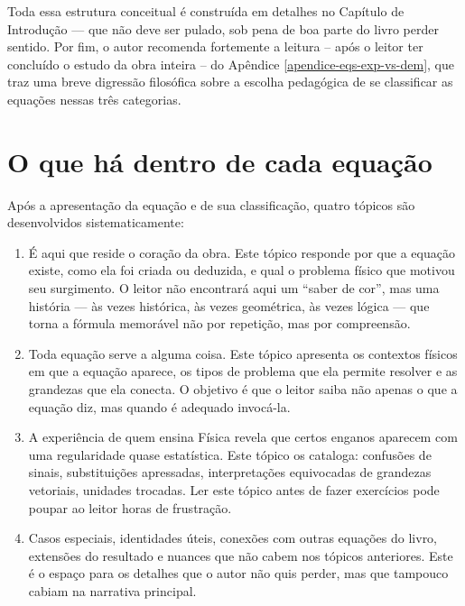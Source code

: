 Toda essa estrutura conceitual é construída em detalhes no Capítulo de Introdução ---
que não deve ser pulado, sob pena de boa parte do livro perder sentido. Por fim, o autor recomenda fortemente a leitura -- após o leitor ter concluído o estudo da obra inteira -- do Apêndice \ref{apendice-eqs-exp-vs-dem}, que traz uma breve digressão filosófica sobre a escolha pedagógica de se classificar as equações nessas três categorias.


\section*{O que há dentro de cada equação}

Após a apresentação da equação e de sua classificação, quatro tópicos são desenvolvidos
sistematicamente:

\begin{enumerate}
  \item[\textbf{De onde vem.}] É aqui que reside o coração da obra. Este tópico responde
  por que a equação existe, como ela foi criada ou deduzida, e qual o problema físico que
  motivou seu surgimento. O leitor não encontrará aqui um ``saber de cor'', mas uma
  história --- às vezes histórica, às vezes geométrica, às vezes lógica --- que torna
  a fórmula memorável não por repetição, mas por compreensão.

  \item[\textbf{Onde é usada.}] Toda equação serve a alguma coisa. Este tópico apresenta
  os contextos físicos em que a equação aparece, os tipos de problema que ela permite
  resolver e as grandezas que ela conecta. O objetivo é que o leitor saiba não apenas
  o que a equação diz, mas quando é adequado invocá-la.

  \item[\textbf{Erros comuns.}] A experiência de quem ensina Física revela que certos
  enganos aparecem com uma regularidade quase estatística. Este tópico os cataloga:
  confusões de sinais, substituições apressadas, interpretações equivocadas de grandezas
  vetoriais, unidades trocadas. Ler este tópico antes de fazer exercícios pode poupar
  ao leitor horas de frustração.

  \item[\textbf{Observações.}] Casos especiais, identidades úteis, conexões com outras
  equações do livro, extensões do resultado e nuances que não cabem nos tópicos
  anteriores. Este é o espaço para os detalhes que o autor não quis perder, mas que
  tampouco cabiam na narrativa principal.
\end{enumerate}



